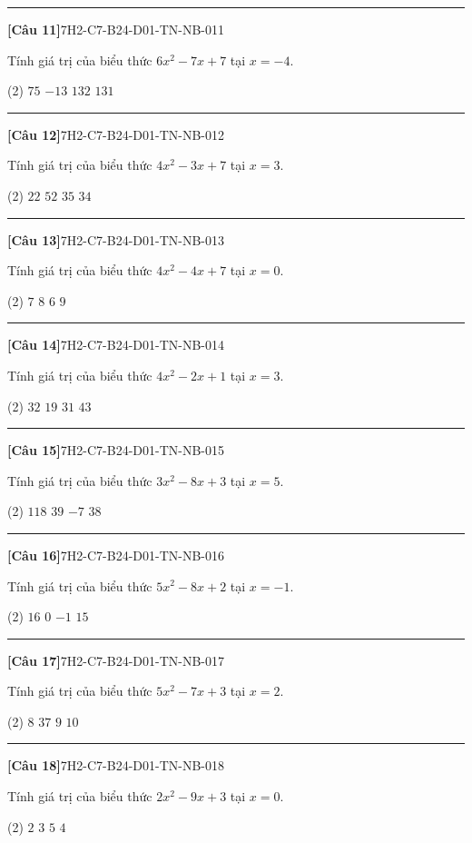 \documentclass[12pt,a4paper]{article}
\newif\ifloigiai
\newenvironment{cauhoi}[2]{%
  \par\medskip\noindent\rule{\textwidth}{0.4pt}\par\nopagebreak
  \noindent\textbf{[#1]}\hfill{\scriptsize\ttfamily #2}\par\nopagebreak\smallskip}{\par}
\newcommand{\dapan}[1]{\ifloigiai\par\smallskip\noindent\textit{Đáp án:} \textbf{#1}\par\fi}
\begin{document}
\begin{cauhoi}{Câu 11}{7H2-C7-B24-D01-TN-NB-011}
Tính giá trị của biểu thức $6x^{2}-7x+7$ tại $x=-4$.
\begin{tasks}(2)
\task $75$
\task $-13$
\task $132$
\task $131$
\end{tasks}
\dapan{D}
\end{cauhoi}
\begin{cauhoi}{Câu 12}{7H2-C7-B24-D01-TN-NB-012}
Tính giá trị của biểu thức $4x^{2}-3x+7$ tại $x=3$.
\begin{tasks}(2)
\task $22$
\task $52$
\task $35$
\task $34$
\end{tasks}
\dapan{D}
\end{cauhoi}
\begin{cauhoi}{Câu 13}{7H2-C7-B24-D01-TN-NB-013}
Tính giá trị của biểu thức $4x^{2}-4x+7$ tại $x=0$.
\begin{tasks}(2)
\task $7$
\task $8$
\task $6$
\task $9$
\end{tasks}
\dapan{A}
\end{cauhoi}
\begin{cauhoi}{Câu 14}{7H2-C7-B24-D01-TN-NB-014}
Tính giá trị của biểu thức $4x^{2}-2x+1$ tại $x=3$.
\begin{tasks}(2)
\task $32$
\task $19$
\task $31$
\task $43$
\end{tasks}
\dapan{C}
\end{cauhoi}
\begin{cauhoi}{Câu 15}{7H2-C7-B24-D01-TN-NB-015}
Tính giá trị của biểu thức $3x^{2}-8x+3$ tại $x=5$.
\begin{tasks}(2)
\task $118$
\task $39$
\task $-7$
\task $38$
\end{tasks}
\dapan{D}
\end{cauhoi}
\begin{cauhoi}{Câu 16}{7H2-C7-B24-D01-TN-NB-016}
Tính giá trị của biểu thức $5x^{2}-8x+2$ tại $x=-1$.
\begin{tasks}(2)
\task $16$
\task $0$
\task $-1$
\task $15$
\end{tasks}
\dapan{D}
\end{cauhoi}
\begin{cauhoi}{Câu 17}{7H2-C7-B24-D01-TN-NB-017}
Tính giá trị của biểu thức $5x^{2}-7x+3$ tại $x=2$.
\begin{tasks}(2)
\task $8$
\task $37$
\task $9$
\task $10$
\end{tasks}
\dapan{C}
\end{cauhoi}
\begin{cauhoi}{Câu 18}{7H2-C7-B24-D01-TN-NB-018}
Tính giá trị của biểu thức $2x^{2}-9x+3$ tại $x=0$.
\begin{tasks}(2)
\task $2$
\task $3$
\task $5$
\task $4$
\end{tasks}
\dapan{B}
\end{cauhoi}
\end{document}
